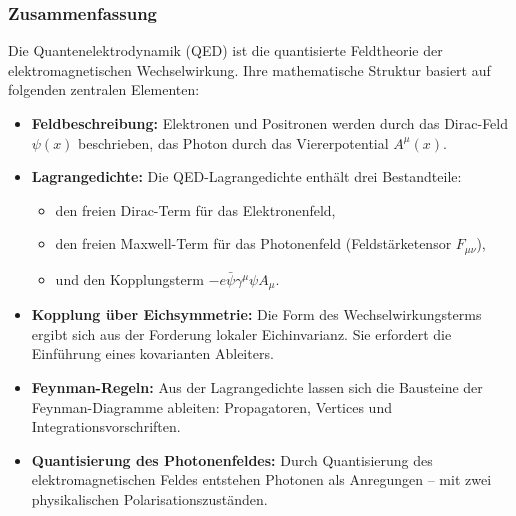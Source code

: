 
\subsubsection{Zusammenfassung}


Die Quantenelektrodynamik (QED) ist die quantisierte Feldtheorie der elektromagnetischen Wechselwirkung. Ihre mathematische Struktur basiert auf folgenden zentralen Elementen:

\begin{itemize}
	\item \textbf{Feldbeschreibung:} Elektronen und Positronen werden durch das Dirac-Feld $\psi(x)$ beschrieben, das Photon durch das Viererpotential $A^\mu(x)$.
	
	\item \textbf{Lagrangedichte:} Die QED-Lagrangedichte enthält drei Bestandteile:
	\begin{itemize}
		\item den freien Dirac-Term für das Elektronenfeld,
		\item den freien Maxwell-Term für das Photonenfeld (Feldstärketensor $F_{\mu\nu}$),
		\item und den Kopplungsterm $-e \bar{\psi} \gamma^\mu \psi A_\mu$.
	\end{itemize}
	
	\item \textbf{Kopplung über Eichsymmetrie:} Die Form des Wechselwirkungsterms ergibt sich aus der Forderung lokaler Eichinvarianz. Sie erfordert die Einführung eines kovarianten Ableiters.
	
	\item \textbf{Feynman-Regeln:} Aus der Lagrangedichte lassen sich die Bausteine der Feynman-Diagramme ableiten: Propagatoren, Vertices und Integrationsvorschriften.
	
	\item \textbf{Quantisierung des Photonenfeldes:} Durch Quantisierung des elektromagnetischen Feldes entstehen Photonen als Anregungen – mit zwei physikalischen Polarisationszuständen.
	
\end{itemize}

